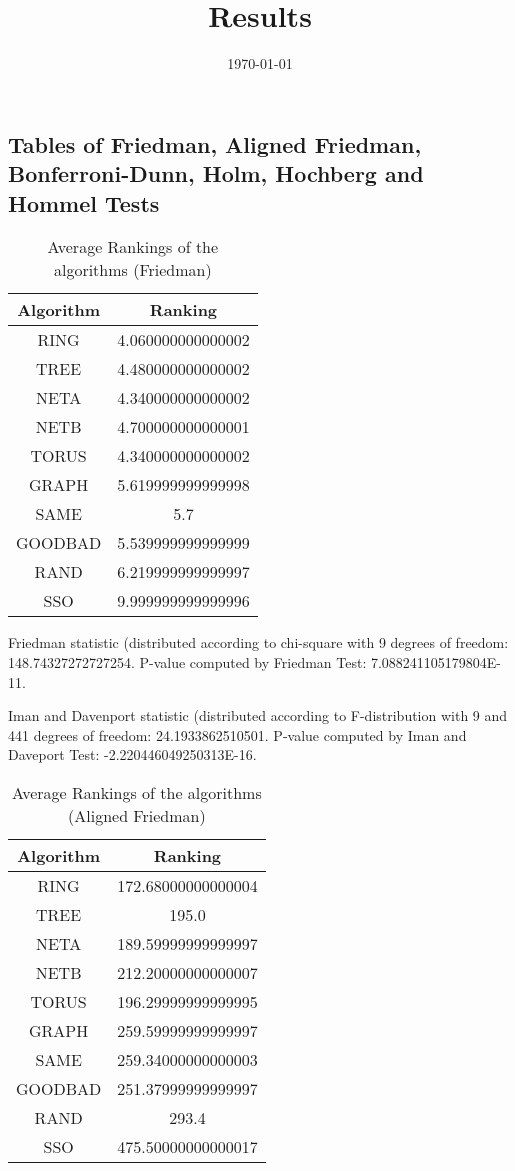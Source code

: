 \documentclass[a4paper,10pt]{article}
\title{Results}
\author{}
\date{\today}
\begin{document}
\begin{landscape}
\oddsidemargin 0in \topmargin 0in\maketitle
\section{Tables of Friedman, Aligned Friedman, Bonferroni-Dunn, Holm, Hochberg and Hommel Tests}
\begin{table}[!htp]
\centering
\caption{Average Rankings of the algorithms (Friedman)
}\begin{tabular}{c|c}
Algorithm&Ranking\\
\hline
 RING&4.060000000000002\\
 TREE&4.480000000000002\\
 NETA&4.340000000000002\\
 NETB&4.700000000000001\\
 TORUS&4.340000000000002\\
 GRAPH&5.619999999999998\\
 SAME&5.7\\
 GOODBAD&5.539999999999999\\
 RAND&6.219999999999997\\
 SSO&9.999999999999996\\
\end{tabular}
\end{table}


Friedman statistic (distributed according to chi-square with 9 degrees of freedom: 148.74327272727254. 
P-value computed by Friedman Test: 7.088241105179804E-11.\newline

Iman and Davenport statistic (distributed according to F-distribution with 9 and 441 degrees of freedom: 24.1933862510501. 
P-value computed by Iman and Daveport Test: -2.220446049250313E-16.\newline


\newpage

\begin{table}[!htp]
\centering
\caption{Average Rankings of the algorithms (Aligned Friedman)
}\begin{tabular}{c|c}
Algorithm&Ranking\\
\hline
 RING&172.68000000000004\\
 TREE&195.0\\
 NETA&189.59999999999997\\
 NETB&212.20000000000007\\
 TORUS&196.29999999999995\\
 GRAPH&259.59999999999997\\
 SAME&259.34000000000003\\
 GOODBAD&251.37999999999997\\
 RAND&293.4\\
 SSO&475.50000000000017\\
\end{tabular}
\end{table}



\end{landscape}
\end{document}
